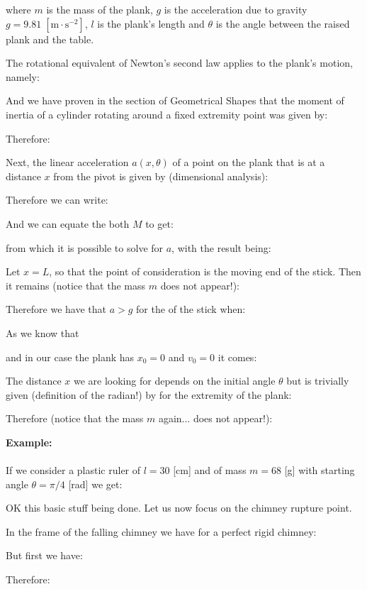 	where $m$ is the mass of the plank, $g$ is the acceleration due to gravity $g = 9.81\;[\text{m}\cdot \text{s}^{-2}]$, $l$ is the plank's length and $\theta$ is the angle between the raised plank and the table.
	
	The rotational equivalent of Newton's second law applies to the plank’s motion, namely:
	
	And we have proven in the section of Geometrical Shapes that the moment of inertia of a cylinder rotating around a fixed extremity point was given by:
	
	Therefore:
	
	Next, the linear acceleration $a(x,\theta)$ of a point on the plank that is at a distance $x$ from the pivot is given by (dimensional analysis):
	
	Therefore we can write:
	
	And we can equate the both $M$ to get:
	
	from which it is possible to solve for $a$, with the result being:
	
	Let $x = L$, so that the point of consideration is the moving end of the stick. Then it remains (notice that the mass $m$ does not appear!):
	
	Therefore we have that $a>g$ for the of the stick when:
	
	As we know that
	
	and in our case the plank has $x_0=0$ and $v_0=0$ it comes:
	
	The distance $x$ we are looking for depends on the initial angle $\theta$ but is trivially given (definition of the radian!) by for the extremity of the plank:
	
	Therefore (notice that the mass $m$ again... does not appear!):
	
	\begin{tcolorbox}[colframe=black,colback=white,sharp corners]
	\textbf{{\Large {}}Example:}\\\\
	If we consider a plastic ruler of $l=30$ [cm] and of mass $m= 68$ [g] with starting angle $\theta=\pi/4$ [rad] we get:
	
	\end{tcolorbox}
	OK this basic stuff being done. Let us now focus on the chimney rupture point.
	
	In the frame of the falling chimney we have for a perfect rigid chimney:
	
	But first we have:
	
	Therefore:
	
